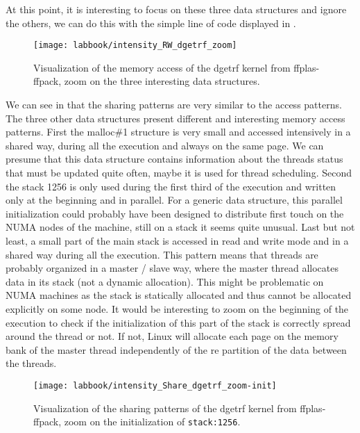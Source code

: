 At this point, it is interesting to focus on these three data structures and ignore the others, we can do this with the simple line of code displayed in .

\begin{figure}[htb]
    \centering
    \texttt{[image: labbook/intensity\_RW\_dgetrf\_zoom]}
    \caption{Visualization of the memory access of the dgetrf kernel from ffplas-ffpack, zoom on the three interesting data structures.}
    \label{fig:dgetrf-share-zoom}
\end{figure}

We can see in  that the sharing patterns are very similar to the access patterns.
The three other data structures present different and interesting memory access patterns.
First the malloc\#1 structure is very small and accessed intensively in a shared way, during all the execution and always on the same page.
We can presume that this data structure contains information about the threads status that must be updated quite often, maybe it is used for thread scheduling.
Second the stack 1256 is only used during the first third of the execution and written only at the beginning and in parallel.
For a generic data structure, this parallel initialization could probably have been designed to distribute first touch on the \gls{NUMA} nodes of the machine, still on a stack it seems quite unusual.
Last but not least, a small part of the main stack is accessed in read and write mode and in a shared way during all the execution.
This pattern means that threads are probably organized in a master / slave way, where the master thread allocates data in its stack (not a dynamic allocation).
This might be problematic on \gls{NUMA} machines as the stack is statically allocated and thus cannot be allocated explicitly on some node.
It would be interesting to zoom on the beginning of the execution to check if the initialization of this part of the stack is correctly spread around the thread or not.
If not, Linux will allocate each page on the memory bank of the master thread independently of the re partition of the data between the threads.

\begin{figure}[htb]
    \centering
    \texttt{[image: labbook/intensity\_Share\_dgetrf\_zoom-init]}
    \caption{Visualization of the sharing patterns of the dgetrf kernel from ffplas-ffpack, zoom on the initialization of \texttt{stack:1256}.}
    \label{fig:dgetrf-share-zoom-init}
\end{figure}

